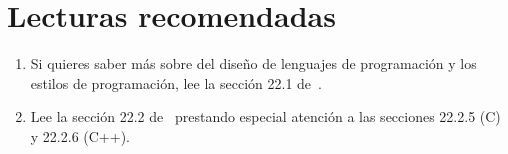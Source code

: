 \section{Lecturas recomendadas}

\begin{enumerate}

\item Si quieres saber más sobre del diseño de lenguajes de programación y 
      los estilos de programación, lee la sección 22.1 de~\cite{stroustrup:2014}.

\item Lee la sección 22.2 de~\cite{stroustrup:2014} prestando especial atención
      a las secciones 22.2.5 (C) y 22.2.6 (C++).

\end{enumerate}
